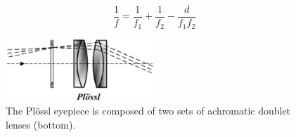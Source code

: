 \documentclass[a4paper]{report}
\begin{document}
\begin{equation}
\frac{1}{f} = \frac{1}{f_1} + \frac{1}{f_2} - \frac{d}{f_1f_2}
\label{eq:compoundLensF}
\end{equation}


\begin{figure}[h]
\center
\includegraphics[width=2.2in]{Plossl.eps}
\caption{The Pl\"{o}ssl eyepiece is composed of two sets of achromatic doublet lenses (bottom).}
\label{fig:composite}
\end{figure}
\end{document}
